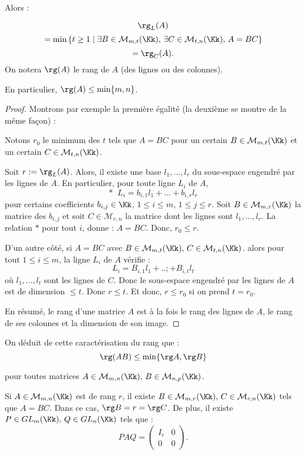 \documentclass[class=report,crop=false]{standalone}
\newcommand{\GL}{GL}
\begin{document}
Alors :
\begin{theoreme}


\[\rg_L(A)\]
\[ = \min\left\{ t \ge 1 \mid \exists B\in \mathcal{M}_{m,t}(\Kk) ,\, \exists C \in \mathcal{M}_{t,n}(\Kk) ,\, A =BC\right\} \]
 \[= \rg_C(A) .\]
On notera $\rg(A)$ le rang de $A$ (des lignes ou des colonnes).

En particulier, $\rg (A) \le \min\{m,n\}$.
\end{theoreme}
\begin{proof}

Montrons par exemple la première égalité (la deuxième se montre de la même fa\c{c}on) :

Notons $r_0$ le minimum des $t$ tels que $A =BC$ pour un certain $B \in \mathcal{M}_{m,t}(\Kk)$ et un certain $C\in \mathcal{M}_{t,n}(\Kk)$.

Soit $r:= \rg_L(A)$. Alors, il existe une base $l_1,...,l_r$ du sous-espace engendré par les lignes de $A$. En particulier, pour toute ligne $L_i$ de $A$, \[* \;\; L_i = b_{i,1}l_1 + ... +b_{i,r}l_r\]
pour certains coefficients $b_{i,j} \in \Kk$, $1 \le i \le m$, $1 \le j \le r$. Soit $B \in \mathcal{M}_{m,r}(\Kk) $ la matrice des $b_{i,j}$ et soit $C\in \mathcal{M}_{r,n}$ la matrice dont les lignes sont $l_1,...,l_r$.
La relation $*$ pour tout $i$, donne : $A =BC$. Donc, $r_0\le r$.

D'un autre côté, si $A = BC$ avec $B \in \mathcal{M}_{m,t}(\Kk) ,\,C\in \mathcal{M}_{t,n}(\Kk)$. alors pour tout $1 \le i\le m$, la ligne $L_i$ de $A$ vérifie :
\[L_i = B_{i,1}l_1 + ..; +B_{i,t}l_t\]
où $l_1,...,l_t$ sont les lignes de $C$. Donc le sous-espace engendré par les lignes de $A$ est de dimension $\le t$. Donc $r \le t$. Et donc, $r \le r_0$ si on prend $t=r_0$.
   
En résumé, le rang d'une matrice $A$ est à la fois le rang des lignes de $A$, le rang de ses colonnes et la dimension de son image.

\end{proof}

On déduit de cette caractérisation du rang que :
\[\rg (AB) \le \min \{\rg A , \rg B\}\]

pour toutes matrices $A \in \mathcal{M}_{m,n}(\Kk),\, B \in \mathcal{M}_{n,p}(\Kk)$.

\begin{proposition}
Si $A \in \mathcal{M}_{m,n}(\Kk)$ est de rang $r$, il existe $B\in\mathcal{M}_{m,r}(\Kk),\, C\in \mathcal{M}_{r,n}(\Kk)$ tels que $A =BC$. Dans ce cas, $\rg B = r=\rg C$. De plus, il existe $P \in \GL_m(\Kk),\, Q \in \GL_n(\Kk)$ tels que :
\[PAQ = \left(\begin{array}{c|c}
I_r &0\\ \hline
0 & 0
\end{array}\right) .\]
\end{proposition}
\end{document}
